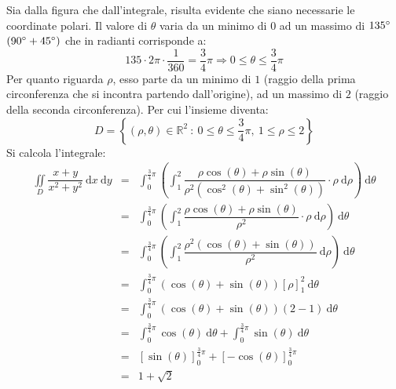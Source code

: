 \documentclass[a4paper]{article}
\begin{document}
	\noindent
	Sia dalla figura che dall'integrale, risulta evidente che siano necessarie le coordinate polari. Il valore di $\theta$ varia da un minimo di $0$ ad un massimo di $135\degree$ $\left(90\degree + 45\degree\right)$ che in radianti corrisponde a:
	\begin{equation*}
		135 \cdot 2\pi \cdot \dfrac{1}{360} = \dfrac{3}{4}\pi \Longrightarrow 0 \le \theta \le \dfrac{3}{4}\pi
	\end{equation*}
	Per quanto riguarda $\rho$, esso parte da un minimo di $1$ (raggio della prima circonferenza che si incontra partendo dall'origine), ad un massimo di $2$ (raggio della seconda circonferenza). Per cui l'insieme diventa:
	\begin{equation*}
		D = \left\{\left(\rho, \theta\right) \in \mathbb{R}^{2} \: : \: 0 \le \theta \le \dfrac{3}{4}\pi, \:1 \le \rho \le 2\right\}
	\end{equation*}
	Si calcola l'integrale:
	\begin{equation*}
		\begin{array}{rcl}
			\displaystyle\iint\limits_{D} \dfrac{x+y}{x^{2}+y^{2}} \:\mathrm{d}x\:\mathrm{d}y
			&=&
			\displaystyle\int_{0}^{\frac{3}{4}\pi} \left(\int_{1}^{2} \dfrac{\rho\cos\left(\theta\right)+\rho\sin\left(\theta\right)}{\rho^{2}\left(\cos^{2}\left(\theta\right)+\sin^{2}\left(\theta\right)\right)} \cdot \rho \:\mathrm{d}\rho\right) \:\mathrm{d}\theta \\ [1.5em]
			&=&
			\displaystyle\int_{0}^{\frac{3}{4}\pi} \left(\int_{1}^{2} \dfrac{\rho\cos\left(\theta\right)+\rho\sin\left(\theta\right)}{\rho^{2}} \cdot \rho \:\mathrm{d}\rho\right) \:\mathrm{d}\theta \\ [1.5em]
			&=&
			\displaystyle\int_{0}^{\frac{3}{4}\pi} \left(\int_{1}^{2} \dfrac{\rho^{2}\left(\cos\left(\theta\right)+\sin\left(\theta\right)\right)}{\rho^{2}} \:\mathrm{d}\rho\right) \:\mathrm{d}\theta \\ [1.5em]
			&=&
			\displaystyle\int_{0}^{\frac{3}{4}\pi} \left(\cos\left(\theta\right)+\sin\left(\theta\right)\right) \left[\rho\right]_{1}^{2} \:\mathrm{d}\theta \\ [1.5em]
			&=&
			\displaystyle\int_{0}^{\frac{3}{4}\pi} \left(\cos\left(\theta\right)+\sin\left(\theta\right)\right) \left(2-1\right) \:\mathrm{d}\theta \\ [1.5em]
			&=&
			\displaystyle\int_{0}^{\frac{3}{4}\pi} \cos\left(\theta\right) \:\mathrm{d}\theta + \int_{0}^{\frac{3}{4}\pi} \sin\left(\theta\right) \:\mathrm{d}\theta \\ [1.5em]
			&=&
			\left[\sin\left(\theta\right)\right]_{0}^{\frac{3}{4}\pi} + \left[-\cos\left(\theta\right)\right]_{0}^{\frac{3}{4}\pi} \\ [1em]
			&=&
			1 + \sqrt{2}
		\end{array}
	\end{equation*}
\end{document}
